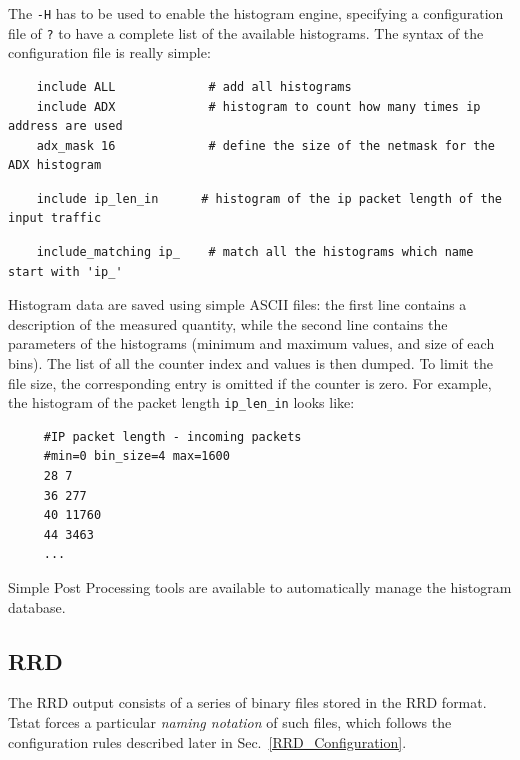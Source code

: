 \documentclass[11pt]{article}
\begin{document}
The \texttt{-H} has to be used to enable the histogram engine, specifying a configuration
file of \texttt{?} to have a complete list of the available histograms. The syntax of
the configuration file is really simple:

\begin{small}\begin{verbatim}
    include ALL             # add all histograms
    include ADX             # histogram to count how many times ip address are used
    adx_mask 16             # define the size of the netmask for the ADX histogram
\end{verbatim}\end{small} \noindent
\begin{small}\begin{verbatim}
    include ip_len_in      # histogram of the ip packet length of the input traffic
\end{verbatim}\end{small} \noindent
\begin{small}\begin{verbatim}
    include_matching ip_    # match all the histograms which name start with 'ip_'
\end{verbatim}\end{small} \noindent
Histogram data are saved using simple ASCII files: 
the first line contains a description of the
measured quantity, while the second line contains the parameters of the histograms
(minimum and maximum values, and size of each bins). The list of all
the counter index and values is then dumped. To limit the file size, the
corresponding entry is omitted if the counter is zero.
For example, the histogram of the packet length \texttt{ip\_len\_in} looks like:

\begin{small}\begin{verbatim}
     #IP packet length - incoming packets
     #min=0 bin_size=4 max=1600
     28 7
     36 277
     40 11760
     44 3463
     ...
\end{verbatim}\end{small} \noindent
Simple \textsf{Post Processing} tools are available to automatically manage the histogram
database.

\subsection{RRD\label{RRD}}


The RRD output consists of a series of binary files stored in the RRD format.
Tstat forces a particular \textit{naming notation} of such files, which follows
the configuration rules described later in Sec.~\ref{RRD_Configuration}.
\end{document}
